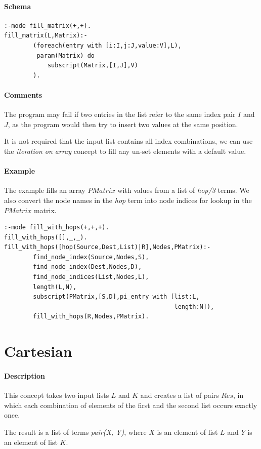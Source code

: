 \documentclass[a4paper,12pt]{report}
\begin{document}
\paragraph{Schema}
\begin{verbatim}
:-mode fill_matrix(+,+).
fill_matrix(L,Matrix):-
        (foreach(entry with [i:I,j:J,value:V],L),
         param(Matrix) do
            subscript(Matrix,[I,J],V)
        ).
\end{verbatim}
\paragraph{Comments}
The program may fail if two entries in the list refer to the same index pair $I$ and $J$, as the program would then try to insert two values at the same position.

It is not required that the input list contains all index combinations, we can use the {\it iteration on array} concept to fill any un-set elements with a default value.
\paragraph{Example}
The example fills an array $PMatrix$ with values from a list of {\it hop/3} terms. We also convert the node names in the {\it hop} term into node indices for lookup in the $PMatrix$ matrix.
\begin{verbatim}
:-mode fill_with_hops(+,+,+).
fill_with_hops([],_,_).
fill_with_hops([hop(Source,Dest,List)|R],Nodes,PMatrix):-
        find_node_index(Source,Nodes,S),
        find_node_index(Dest,Nodes,D),
        find_node_indices(List,Nodes,L),
        length(L,N), 
        subscript(PMatrix,[S,D],pi_entry with [list:L,
                                               length:N]),
        fill_with_hops(R,Nodes,PMatrix).
\end{verbatim}

\pagebreak
\section{Cartesian}
\paragraph{Description}
This concept takes two input lists $L$ and $K$ and creates a list of pairs $Res$, in which each combination of elements of the first and the second list occurs exactly once.

The result is a list of terms {\it pair(X, Y)}, where $X$ is an element of list $L$ and $Y$ is an element of list $K$.
\end{document}
